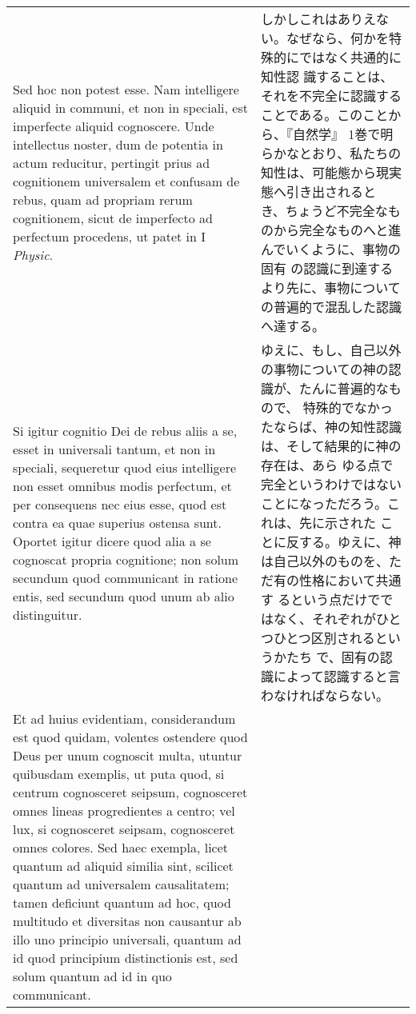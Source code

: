 \documentclass[10pt]{jsarticle} %
\begin{document}
\begin{longtable}{p{21em}p{21em}}
\\



Sed hoc non potest esse. Nam intelligere aliquid in communi, et non in
speciali, est imperfecte aliquid cognoscere. Unde intellectus noster,
dum de potentia in actum reducitur, pertingit prius ad cognitionem
universalem et confusam de rebus, quam ad propriam rerum cognitionem,
sicut de imperfecto ad perfectum procedens, ut patet in I {\itshape
Physic}.

&

しかしこれはありえない。なぜなら、何かを特殊的にではなく共通的に知性認
識することは、それを不完全に認識することである。このことから、『自然学』
1巻で明らかなとおり、私たちの知性は、可能態から現実態へ引き出されると
き、ちょうど不完全なものから完全なものへと進んでいくように、事物の固有
の認識に到達するより先に、事物についての普遍的で混乱した認識へ達する。

\\

Si igitur cognitio Dei de rebus aliis a se, esset in universali
tantum, et non in speciali, sequeretur quod eius intelligere non esset
omnibus modis perfectum, et per consequens nec eius esse, quod est
contra ea quae superius ostensa sunt. Oportet igitur dicere quod alia
a se cognoscat propria cognitione; non solum secundum quod communicant
in ratione entis, sed secundum quod unum ab alio distinguitur.

&

ゆえに、もし、自己以外の事物についての神の認識が、たんに普遍的なもので、
特殊的でなかったならば、神の知性認識は、そして結果的に神の存在は、あら
ゆる点で完全というわけではないことになっただろう。これは、先に示された
ことに反する。ゆえに、神は自己以外のものを、ただ有の性格において共通す
るという点だけでではなく、それぞれがひとつひとつ区別されるというかたち
で、固有の認識によって認識すると言わなければならない。

\\


Et ad huius evidentiam, considerandum est quod quidam, volentes
ostendere quod Deus per unum cognoscit multa, utuntur quibusdam
exemplis, ut puta quod, si centrum cognosceret seipsum, cognosceret
omnes lineas progredientes a centro; vel lux, si cognosceret seipsam,
cognosceret omnes colores. Sed haec exempla, licet quantum ad aliquid
similia sint, scilicet quantum ad universalem causalitatem; tamen
deficiunt quantum ad hoc, quod multitudo et diversitas non causantur
ab illo uno principio universali, quantum ad id quod principium
distinctionis est, sed solum quantum ad id in quo communicant.


\end{longtable}
\end{document}
